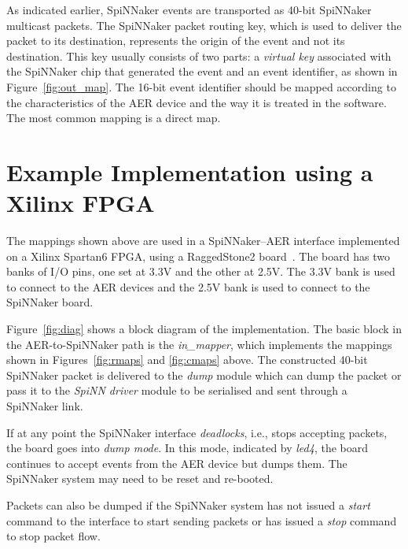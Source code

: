 As indicated earlier, SpiNNaker events are transported as 40-bit
SpiNNaker multicast packets. The SpiNNaker packet routing key, which
is used to deliver the packet to its destination, represents the
origin of the event and not its destination. This key usually consists
of two parts: a \emph{virtual key} associated with the SpiNNaker chip
that generated the event and an event identifier, as shown in
Figure~\ref{fig:out_map}. The 16-bit event identifier should be mapped
according to the characteristics of the AER device and the way it is
treated in the software. The most common mapping is a direct map.\\





\section{Example Implementation using a Xilinx FPGA}


The mappings shown above are used in a SpiNNaker--AER interface
implemented on a Xilinx Spartan6 FPGA, using a RaggedStone2
board~\cite{ragged}. The board has two banks of I/O pins, one set at
3.3V and the other at 2.5V. The 3.3V bank is used to connect to the
AER devices and the 2.5V bank is used to connect to the SpiNNaker
board.




Figure~\ref{fig:diag} shows a block diagram of the implementation. The
basic block in the AER-to-SpiNNaker path is the \emph{in\_mapper},
which implements the mappings shown in Figures~\ref{fig:rmaps}
and \ref{fig:cmaps} above. The constructed 40-bit SpiNNaker packet is
delivered to the \emph{dump} module which can dump the packet or pass
it to the \emph{SpiNN driver} module to be serialised and sent through
a SpiNNaker link.

If at any point the SpiNNaker interface \emph{deadlocks}, i.e., stops
accepting packets, the board goes into \emph{dump mode}. In this mode,
indicated by \emph{led4}, the board continues to accept events from
the AER device but dumps them. The SpiNNaker system may need to be
reset and re-booted.

Packets can also be dumped if the SpiNNaker system has not issued
a \emph{start} command to the interface to start sending packets or
has issued a \emph{stop} command to stop packet flow.

